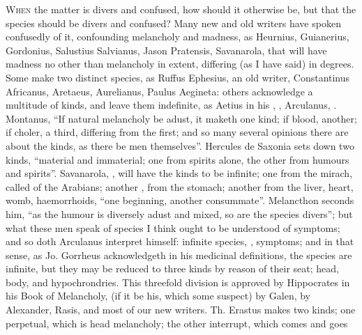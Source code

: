 \lettrine{W}{hen} the matter is divers and confused, how should it otherwise
be, but that the species should be divers and confused? Many new and old
writers have spoken confusedly of it, confounding melancholy and madness, as
Heurnius, Guianerius, Gordonius, Salustius Salvianus,
Jason Pratensis, Savanarola, that will have madness no other than melancholy in
extent, differing (as I have said) in degrees. Some make two distinct species,
as Ruffus Ephesius, an old writer, Constantinus Africanus, Aretaeus,
Aurelianus, Paulus Aegineta: others
acknowledge a multitude of kinds, and leave them indefinite, as Aetius in his
, \Avicenna{},
 Arculanus,
. Montanus,
 \enquote{If natural
melancholy be adust, it maketh one kind; if blood, another; if choler, a third,
differing from the first; and so many several opinions there are about the
kinds, as there be men themselves}. Hercules de Saxonia
sets down two kinds, \enquote{material and immaterial; one from spirits alone, the
other from humours and spirits}. Savanarola, , will have the kinds to be infinite;
one from the mirach, called  of the Arabians; another
, from the stomach; another from the liver, heart, womb,
haemorrhoids, \enquote{one beginning, another consummate}.
Melancthon seconds him, \enquote{as the humour is diversely adust
and mixed, so are the species divers}; but what these men speak of species I
think ought to be understood of symptoms; and so doth
Arculanus interpret himself: infinite species, , symptoms; and in that sense, as Jo. Gorrheus acknowledgeth in his
medicinal definitions, the species are infinite, but they may be reduced to
three kinds by reason of their seat; head, body, and hypochrondries. This
threefold division is approved by Hippocrates in his Book of Melancholy, (if it
be his, which some suspect) by Galen,  by Alexander, 
Rasis, 
\Avicenna{} and most of our new writers. Th. Erastus makes two kinds; one
perpetual, which is head melancholy; the other interrupt, which comes and goes
